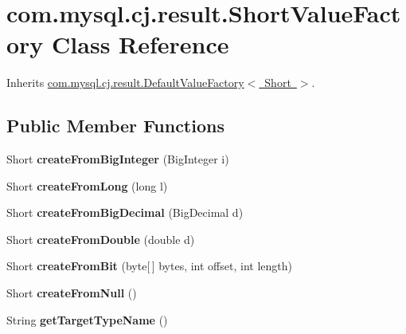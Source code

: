 \hypertarget{classcom_1_1mysql_1_1cj_1_1result_1_1_short_value_factory}{}\section{com.\+mysql.\+cj.\+result.\+Short\+Value\+Factory Class Reference}
\label{classcom_1_1mysql_1_1cj_1_1result_1_1_short_value_factory}


Inherits \mbox{\hyperlink{classcom_1_1mysql_1_1cj_1_1result_1_1_default_value_factory}{com.\+mysql.\+cj.\+result.\+Default\+Value\+Factory$<$ Short $>$}}.

\subsection*{Public Member Functions}
\begin{DoxyCompactItemize}
\item 
\mbox{\label{classcom_1_1mysql_1_1cj_1_1result_1_1_short_value_factory_a0aa9b8fe3a70ebcaa91b3c961064780b}} 
Short {\bfseries create\+From\+Big\+Integer} (Big\+Integer i)
\item 
\mbox{\label{classcom_1_1mysql_1_1cj_1_1result_1_1_short_value_factory_a2170932ba802d33d6f3628cc82b035e5}} 
Short {\bfseries create\+From\+Long} (long l)
\item 
\mbox{\label{classcom_1_1mysql_1_1cj_1_1result_1_1_short_value_factory_abc8e5aff416075b50c3e3088e8bb09e7}} 
Short {\bfseries create\+From\+Big\+Decimal} (Big\+Decimal d)
\item 
\mbox{\label{classcom_1_1mysql_1_1cj_1_1result_1_1_short_value_factory_ad828351339c467488179817a62caab37}} 
Short {\bfseries create\+From\+Double} (double d)
\item 
\mbox{\label{classcom_1_1mysql_1_1cj_1_1result_1_1_short_value_factory_ad82a2b024ca66fc629addeba1dc3ffe1}} 
Short {\bfseries create\+From\+Bit} (byte\mbox{[}$\,$\mbox{]} bytes, int offset, int length)
\item 
\mbox{\label{classcom_1_1mysql_1_1cj_1_1result_1_1_short_value_factory_afa8ffda4b6a1c8421c6fe871d2168675}} 
Short {\bfseries create\+From\+Null} ()
\item 
\mbox{\label{classcom_1_1mysql_1_1cj_1_1result_1_1_short_value_factory_a7e17ae9199e54664032a032e35e1e525}} 
String {\bfseries get\+Target\+Type\+Name} ()
\end{DoxyCompactItemize}


